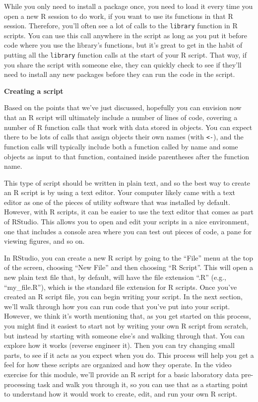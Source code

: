 \documentclass[]{tufte-book}
\begin{document}
While you only need to install a package once, you need to load it every
time you open a new R session to do work, if you want to use its functions in
that R session. Therefore, you'll often see a lot of calls to the \texttt{library}
function in R scripts. You can use this call anywhere in the script as long as
you put it before code where you use the library's functions, but it's great to
get in the habit of putting all the \texttt{library} function calls at the start of
your R script. That way, if you share the script with someone else, they can
quickly check to see if they'll need to install any new packages before they can
run the code in the script.

\textbf{Creating a script}

Based on the points that we've just discussed, hopefully you can envision now
that an R script will ultimately include a number of lines of code, covering a
number of R function calls that work with data stored in objects. You can expect
there to be lots of calls that assign objects their own names (with \texttt{\textless{}-}), and
the function calls will typically include both a function called by name and
some objects as input to that function, contained inside parentheses after the
function name.

This type of script should be written in plain text, and so the best way to
create an R script is by using a text editor. Your computer likely came with a
text editor as one of the pieces of utility software that was installed by
default. However, with R scripts, it can be easier to use the text editor that
comes as part of RStudio. This allows you to open and edit your scripts in a
nice environment, one that includes a console area where you can test out pieces
of code, a pane for viewing figures, and so on.

In RStudio, you can create a new R script by going to the ``File'' menu at the top
of the screen, choosing ``New File'' and then choosing ``R Script''. This will open
a new plain text file that, by default, will have the file extension ``.R'' (e.g.,
``my\_file.R''), which is the standard file extension for R scripts. Once you've
created an R script file, you can begin writing your script. In the next
section, we'll walk through how you can run code that you've put into your
script. However, we think it's worth mentioning that, as you get started on this
process, you might find it easiest to start not by writing your own R script
from scratch, but instead by starting with someone else's and walking through
that. You can explore how it works (reverse engineer it). Then you can try
changing small parts, to see if it acts as you expect when you do. This process
will help you get a feel for how these scripts are organized and how they
operate. In the video exercise for this module, we'll provide an R script for a
basic laboratory data pre-processing task and walk you through it, so you can use
that as a starting point to understand how it would work to create, edit, and
run your own R script.
\end{document}
